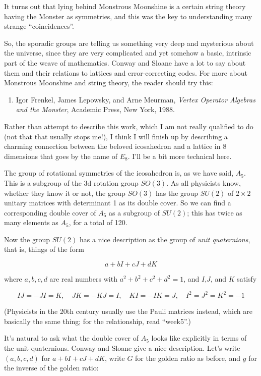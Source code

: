 \documentclass{article}
\def\tightlist{}
\begin{document}
It turns out that lying behind Monstrous Moonshine is a certain string
theory having the Monster as symmetries, and this was the key to
understanding many strange ``coincidences''.

So, the sporadic groups are telling us something very deep and
mysterious about the universe, since they are very complicated and yet
somehow a basic, intrinsic part of the weave of mathematics. Conway and
Sloane have a lot to say about them and their relations to lattices and
error-correcting codes. For more about Monstrous Moonshine and string
theory, the reader should try this:

\begin{enumerate}
\def\labelenumi{\arabic{enumi})}
\setcounter{enumi}{1}
\tightlist
\item
  Igor Frenkel, James Lepowsky, and Arne Meurman, \emph{Vertex Operator
  Algebras and the Monster}, Academic Press, New York, 1988.
\end{enumerate}

Rather than attempt to describe this work, which I am not really
qualified to do (not that that usually stops me!), I think I will finish
up by describing a charming connection between the beloved icosahedron
and a lattice in 8 dimensions that goes by the name of \(E_8\). I'll be
a bit more technical here.

The group of rotational symmetries of the icosahedron is, as we have
said, \(A_5\). This is a subgroup of the 3d rotation group \(SO(3)\). As
all physicists know, whether they know it or not, the group \(SO(3)\)
has the group \(SU(2)\) of \(2\times2\) unitary matrices with
determinant 1 as its double cover. So we can find a corresponding double
cover of \(A_5\) as a subgroup of \(SU(2)\); this has twice as many
elements as \(A_5\), for a total of 120.

Now the group \(SU(2)\) has a nice description as the group of
\emph{unit quaternions}, that is, things of the form

\[a + bI + cJ + dK\]

where \(a,b,c,d\) are real numbers with \(a^2 + b^2 + c^2 + d^2 = 1\),
and \(I\),\(J\), and \(K\) satisfy

\[IJ = -JI = K, \quad JK = -KJ = I, \quad KI = -IK = J, \quad I^2 = J^2 = K^2 = -1\]

(Physicists in the 20th century usually use the Pauli matrices instead,
which are basically the same thing; for the relationship, read
``week5''.)

It's natural to ask what the double cover of \(A_5\) looks like
explicitly in terms of the unit quaternions. Conway and Sloane give a
nice description. Let's write \((a,b,c,d)\) for \(a + bI + cJ + dK\),
write \(G\) for the golden ratio as before, and \(g\) for the inverse of
the golden ratio:
\end{document}
